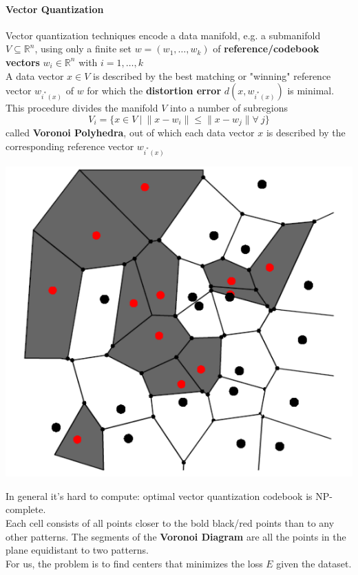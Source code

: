 \documentclass[10pt]{report}
\begin{document}
\paragraph{Vector Quantization} Vector quantization techniques encode a data manifold, e.g. a submanifold $V\subseteq \mathbb{R}^n$, using only a finite set $w=(w_1,\ldots,w_k)$ of \textbf{reference/codebook vectors} $w_i\in \mathbb{R}^n$ with $i=1,\ldots,k$\\
A data vector $x\in V$ is described by the best matching or "winning" reference vector $w_{i^*(x)}$ of $w$ for which the \textbf{distortion error} $d(x, w_{i^*(x)})$ is minimal.\\
This procedure divides the manifold $V$ into a number of subregions $$V_i=\{x\in V\:|\:\|x-w_i\|\leq \|x-w_j\|\forall\:j\}$$ called \textbf{Voronoi Polyhedra}, out of which each data vector $x$ is described by the corresponding reference vector $w_{i^*(x)}$
\begin{center}
	\includegraphics[scale=0.5]{32.png}
\end{center}
In general it's hard to compute: optimal vector quantization codebook is NP-complete.\\
Each cell consists of all points closer to the bold black/red points than to any other patterns. The segments of the \textbf{Voronoi Diagram} are all the points in the plane equidistant to two patterns.\\
For us, the problem is to find centers that minimizes the loss $E$ given the dataset.\\\\
\end{document}
